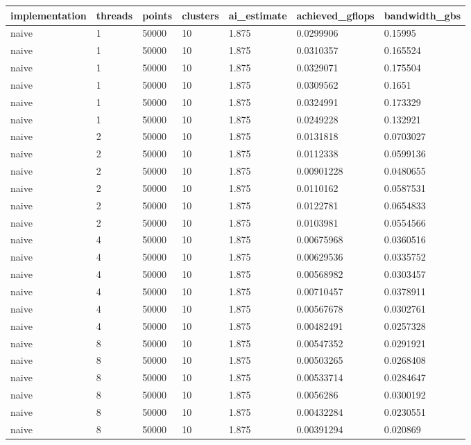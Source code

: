 \begin{table}[ht]
\centering
\small
\begin{tabular}{lllllll}
\hline
implementation & threads & points & clusters & ai_estimate & achieved_gflops & bandwidth_gbs \\ 
\hline
naive & 1 & 50000 & 10 & 1.875 & 0.0299906 & 0.15995 \\ 
naive & 1 & 50000 & 10 & 1.875 & 0.0310357 & 0.165524 \\ 
naive & 1 & 50000 & 10 & 1.875 & 0.0329071 & 0.175504 \\ 
naive & 1 & 50000 & 10 & 1.875 & 0.0309562 & 0.1651 \\ 
naive & 1 & 50000 & 10 & 1.875 & 0.0324991 & 0.173329 \\ 
naive & 1 & 50000 & 10 & 1.875 & 0.0249228 & 0.132921 \\ 
naive & 2 & 50000 & 10 & 1.875 & 0.0131818 & 0.0703027 \\ 
naive & 2 & 50000 & 10 & 1.875 & 0.0112338 & 0.0599136 \\ 
naive & 2 & 50000 & 10 & 1.875 & 0.00901228 & 0.0480655 \\ 
naive & 2 & 50000 & 10 & 1.875 & 0.0110162 & 0.0587531 \\ 
naive & 2 & 50000 & 10 & 1.875 & 0.0122781 & 0.0654833 \\ 
naive & 2 & 50000 & 10 & 1.875 & 0.0103981 & 0.0554566 \\ 
naive & 4 & 50000 & 10 & 1.875 & 0.00675968 & 0.0360516 \\ 
naive & 4 & 50000 & 10 & 1.875 & 0.00629536 & 0.0335752 \\ 
naive & 4 & 50000 & 10 & 1.875 & 0.00568982 & 0.0303457 \\ 
naive & 4 & 50000 & 10 & 1.875 & 0.00710457 & 0.0378911 \\ 
naive & 4 & 50000 & 10 & 1.875 & 0.00567678 & 0.0302761 \\ 
naive & 4 & 50000 & 10 & 1.875 & 0.00482491 & 0.0257328 \\ 
naive & 8 & 50000 & 10 & 1.875 & 0.00547352 & 0.0291921 \\ 
naive & 8 & 50000 & 10 & 1.875 & 0.00503265 & 0.0268408 \\ 
naive & 8 & 50000 & 10 & 1.875 & 0.00533714 & 0.0284647 \\ 
naive & 8 & 50000 & 10 & 1.875 & 0.0056286 & 0.0300192 \\ 
naive & 8 & 50000 & 10 & 1.875 & 0.00432284 & 0.0230551 \\ 
naive & 8 & 50000 & 10 & 1.875 & 0.00391294 & 0.020869 \\ 

\end{tabular}
\end{table}

